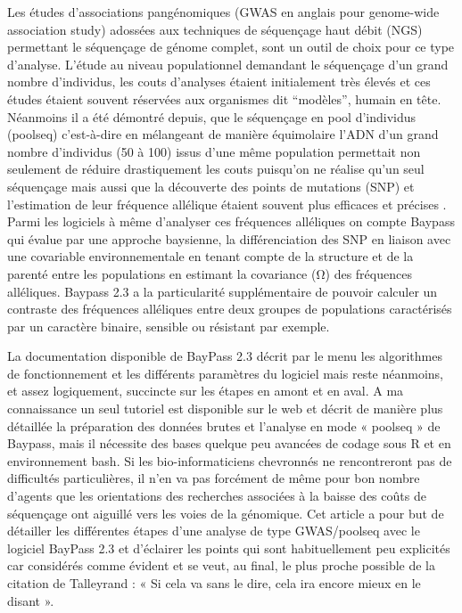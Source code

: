 \documentclass[
  openany]{book}
\theoremstyle{definition}
\theoremstyle{definition}
\theoremstyle{definition}
\theoremstyle{definition}
\theoremstyle{remark}
\begin{document}
Les études d'associations pangénomiques (GWAS en anglais pour genome-wide association study) adossées aux techniques de séquençage haut débit (NGS) permettant le séquençage de génome complet, sont un outil de choix pour ce type d'analyse. L'étude au niveau populationnel demandant le séquençage d'un grand nombre d'individus, les couts d'analyses étaient initialement très élevés et ces études étaient souvent réservées aux organismes dit ``modèles'', humain en tête. Néanmoins il a été démontré depuis, que le séquençage en pool d'individus (poolseq) c'est-à-dire en mélangeant de manière équimolaire l'ADN d'un grand nombre d'individus (50 à 100) issus d'une même population permettait non seulement de réduire drastiquement les couts puisqu'on ne réalise qu'un seul séquençage mais aussi que la découverte des points de mutations (SNP) et l'estimation de leur fréquence allélique étaient souvent plus efficaces et précises \citep{futschik_next_2010}. Parmi les logiciels à même d'analyser ces fréquences alléliques on compte Baypass \citep{gautier_genome-wide_2015} qui évalue par une approche baysienne, la différenciation des SNP en liaison avec une covariable environnementale en tenant compte de la structure et de la parenté entre les populations en estimant la covariance (Ω) des fréquences alléliques. Baypass 2.3 a la particularité supplémentaire de pouvoir calculer un contraste des fréquences alléliques entre deux groupes de populations caractérisés par un caractère binaire, sensible ou résistant par exemple.

La documentation disponible de BayPass 2.3 décrit par le menu les algorithmes de fonctionnement et les différents paramètres du logiciel mais reste néanmoins, et assez logiquement, succincte sur les étapes en amont et en aval. A ma connaissance un seul tutoriel est disponible sur le web \citep{nielsen_pool-seq_2020} et décrit de manière plus détaillée la préparation des données brutes et l'analyse en mode « poolseq » de Baypass, mais il nécessite des bases quelque peu avancées de codage sous R et en environnement bash. Si les bio-informaticiens chevronnés ne rencontreront pas de difficultés particulières, il n'en va pas forcément de même pour bon nombre d'agents que les orientations des recherches associées à la baisse des coûts de séquençage ont aiguillé vers les voies de la génomique. Cet article a pour but de détailler les différentes étapes d'une analyse de type GWAS/poolseq avec le logiciel BayPass 2.3 et d'éclairer les points qui sont habituellement peu explicités car considérés comme évident et se veut, au final, le plus proche possible de la citation de Talleyrand : « Si cela va sans le dire, cela ira encore mieux en le disant ».
\end{document}
